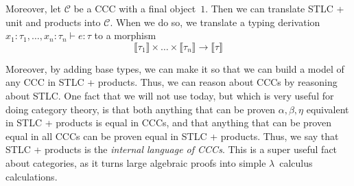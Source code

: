 \documentclass{lecturenotes}
\newcommand{\tabs}[3]{\ensuremath{\lambda #1 \colon #2.\,#3}}
\newcommand{\app}[2]{\ensuremath{#1\;#2}}
\newcommand{\utype}{\textsf{unit}\xspace}
\newcommand{\unit}{\ensuremath{\textsf{(}\mkern0.5mu\textsf{)}}}
\newcommand{\prodtype}[2]{\ensuremath{#1 \times #2}}
\newcommand{\pair}[2]{\ensuremath{(#1, #2)}}
\newcommand{\projl}[1]{\ensuremath{\pi_1\mkern2mu#1}}
\newcommand{\projr}[1]{\ensuremath{\pi_2\mkern3mu#1}}
\newcommand{\prodmor}[2]{\ensuremath{\langle #1, #2 \rangle}}
\begin{document}
Moreover, let $\mathcal{C}$ be a CCC with a final object~$1$.
Then we can translate STLC + unit and products into $\mathcal{C}$.
When we do so, we translate a typing derivation $x_1 : \tau_1, \dots, x_n : \tau_n \vdash e : \tau$ to a morphism $$ \llbracket \tau_1 \rrbracket \times \dots \times \llbracket \tau_n \rrbracket \to \llbracket \tau \rrbracket$$

Moreover, by adding base types, we can make it so that we can build a model of any CCC in STLC + products.
Thus, we can reason about CCCs by reasoning about STLC.
One fact that we will not use today, but which is very useful for doing category theory, is that both anything that can be proven $\alpha, \beta, \eta$ equivalent in STLC + products is equal in CCCs, and that anything that can be proven equal in all CCCs can be proven equal in STLC + products.
Thus, we say that STLC + products is the \emph{internal language of CCCs}.
This is a super useful fact about categories, as it turns large algebraic proofs into simple $\lambda$~calculus calculations.
\end{document}
